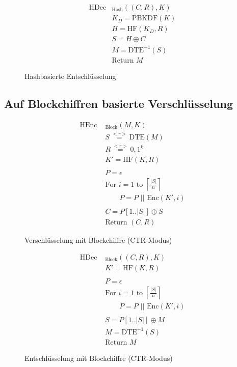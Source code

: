 \documentclass[12pt]{scrartcl}
\begin{document}
\begin{figure}[h]
	\begin{align*}
		\text{HDec}&_{\text{Hash}}((C,R), K)\\
		&K_D = \text{PBKDF}(K)\\ 		%
		&H = \text{HF}(K_D,R)\\	%
		&S = H \oplus C\\	%
		&M = \text{DTE}^{-1}(S)\\ 	%
		&\text{Return } M
	\end{align*}
	\caption{Hashbasierte Entschlüsselung}
	\label{fig:HashDec}
\end{figure}



\subsection{Auf Blockchiffren basierte Verschlüsselung}

\begin{figure}[h]
	\begin{align*}
		\text{HEnc }&_{\text{Block}}(M, K)\\
		&S \overset{<r>}{=} \text{DTE}(M)\\ 	%
		&R \overset{<r>}{=} {0,1}^k\\	%
		&K' = \text{HF}(K,R)\\ 		%
		\\
		&P = \epsilon \\
		&\text{For } i = 1 \text{ to } \left\lceil \frac{|S|}{n} \right\rceil \\
		&\qquad P = P \text{ || Enc}(K',i)\\	%
		\\
		&C = P[1 .. |S|] \oplus S\\	%
		&\text{Return } (C,R)
	\end{align*}
	\caption{Verschlüsselung mit Blockchiffre (CTR-Modus)}
	\label{fig:BlockEnc}
\end{figure}

\begin{figure}[h]
	\begin{align*}
		\text{HDec }&_{\text{Block}}((C,R), K)\\
		&K' = \text{HF}(K,R)\\ 		%
		\\
		&P = \epsilon \\
		&\text{For } i = 1 \text{ to } \left\lceil \frac{|S|}{n} \right\rceil \\
		&\qquad P = P \text{ || Enc}(K',i)\\	%
		\\
		&S = P[1 .. |S|] \oplus M\\	%
		&M = \text{DTE}^{-1}(S)\\ 	%
		&\text{Return } M
	\end{align*}
	\caption{Entschlüsselung mit Blockchiffre (CTR-Modus)}
	\label{fig:BlockDec}
\end{figure}
\end{document}
